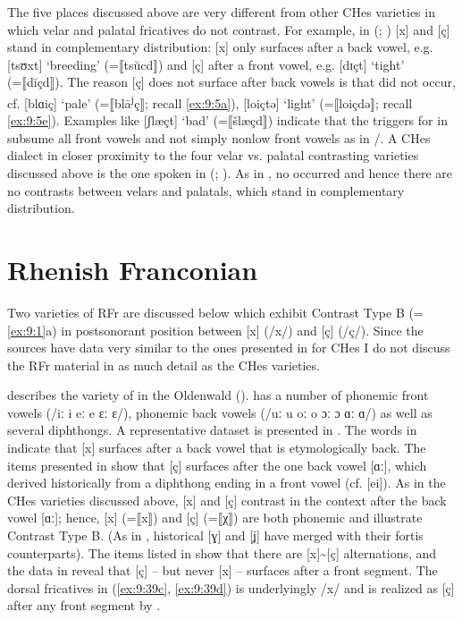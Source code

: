 The five places discussed above are very different from other CHes varieties in which velar and palatal fricatives do not contrast. For example, in  (\citealt{Leidolf1891}; ) [x] and [ç] stand in complementary distribution: [x] only surfaces after a back vowel, e.g. [tsʊxt] ‘breeding’ (=⟦tsŭcd⟧) and [ç] after a front vowel, e.g. [dɪçt] ‘tight’ (=⟦dĭçd⟧). The reason [ç] does not surface after back vowels is that  did not occur, cf.  [blɑiç] ‘pale’ (=⟦blā\textsuperscript{j}ç⟧; recall \ref{ex:9:5a}), [loiçtə] ‘light’ (=⟦loiçdə⟧; recall \ref{ex:9:5e}). Examples like [ʃlæçt] ‘bad’ (=⟦šlæçd⟧) indicate that the triggers for  in  subsume all front vowels and not simply nonlow front vowels as in \slash{}. A CHes dialect in closer proximity to the four velar vs. palatal contrasting varieties discussed above is the one spoken in  (\citealt{Schaefer1907}; ). As in , no  occurred and hence there are no contrasts between velars and palatals, which stand in complementary distribution.

\section{{Rhenish} {Franconian}}\label{sec:9.3}

Two varieties of RFr are discussed below which exhibit Contrast Type B (=\ref{ex:9:1}a) in postsonorant position between [x] (/x/) and [ç] (/ç/). Since the sources have data very similar to the ones presented in  for CHes I do not discuss the RFr material in as much detail as the CHes varieties.

\citet{Freiling1929} describes the variety of  in the Oldenwald ().  has a number of phonemic front vowels (/iː i eː e ɛː ɛ/), phonemic back vowels (/uː u oː o ɔː ɔ ɑː ɑ/) as well as several diphthongs. A representative dataset is presented in . The words in  indicate that [x] surfaces after a back vowel that is etymologically back. The items presented in  show that [ç] surfaces after the one back vowel [ɑː], which derived historically from a diphthong ending in a front vowel (cf.  [ei]). As in the CHes varieties discussed above, [x] and [ç] contrast in the context after the back vowel [ɑː]; hence, [x] (=⟦x⟧) and [ç] (=⟦χ⟧) are both phonemic and illustrate Contrast Type B. (As in , historical [ɣ] and [ʝ] have merged with their fortis counterparts). The items listed in  show that there are [x]{\textasciitilde}[ç] alternations, and the data in  reveal that [ç] -- but never [x] -- surfaces after a front segment. The dorsal fricatives in (\ref{ex:9:39c}, \ref{ex:9:39d}) is underlyingly /x/ and is realized as [ç] after any front segment by .

